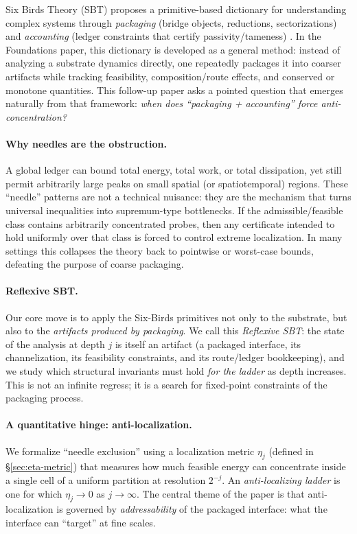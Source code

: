 \documentclass[11pt]{article}
\theoremstyle{plain}
\theoremstyle{definition}
\theoremstyle{remark}
\begin{document}
Six Birds Theory (SBT) proposes a primitive-based dictionary for understanding complex systems through \emph{packaging} (bridge objects, reductions, sectorizations) and \emph{accounting} (ledger constraints that certify passivity/tameness) \cite{sixbirds_foundations}.
In the Foundations paper, this dictionary is developed as a general method: instead of analyzing a substrate dynamics directly, one repeatedly packages it into coarser artifacts while tracking feasibility, composition/route effects, and conserved or monotone quantities.
This follow-up paper asks a pointed question that emerges naturally from that framework:
\emph{when does ``packaging + accounting'' force anti-concentration?}

\paragraph{Why needles are the obstruction.}
A global ledger can bound total energy, total work, or total dissipation, yet still permit arbitrarily large peaks on small spatial (or spatiotemporal) regions.
These ``needle'' patterns are not a technical nuisance: they are the mechanism that turns universal inequalities into supremum-type bottlenecks.
If the admissible/feasible class contains arbitrarily concentrated probes, then any certificate intended to hold uniformly over that class is forced to control extreme localization.
In many settings this collapses the theory back to pointwise or worst-case bounds, defeating the purpose of coarse packaging.

\paragraph{Reflexive SBT.}
Our core move is to apply the Six-Birds primitives not only to the substrate, but also to the \emph{artifacts produced by packaging}.
We call this \emph{Reflexive SBT}: the state of the analysis at depth \(j\) is itself an artifact (a packaged interface, its channelization, its feasibility constraints, and its route/ledger bookkeeping), and we study which structural invariants must hold \emph{for the ladder} as depth increases.
This is not an infinite regress; it is a search for fixed-point constraints of the packaging process.

\paragraph{A quantitative hinge: anti-localization.}
We formalize ``needle exclusion'' using a localization metric \(\eta_j\) (defined in \S\ref{sec:eta-metric}) that measures how much feasible energy can concentrate inside a single cell of a uniform partition at resolution \(2^{-j}\).
An \emph{anti-localizing ladder} is one for which \(\eta_j \to 0\) as \(j \to \infty\).
The central theme of the paper is that anti-localization is governed by \emph{addressability} of the packaged interface: what the interface can ``target'' at fine scales.
\end{document}
